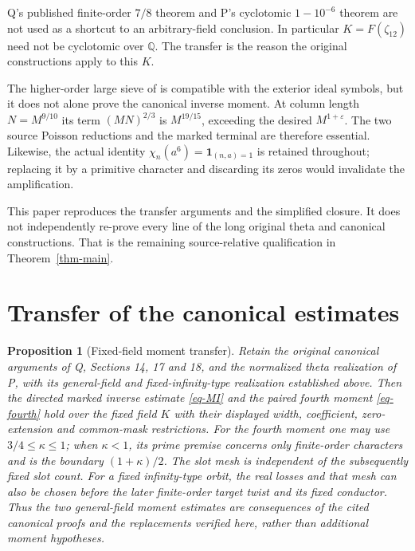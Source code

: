 \documentclass[11pt,a4paper]{article}
\newtheorem{proposition}[theorem]{Proposition}
\theoremstyle{remark}\newtheorem{remark}[theorem]{Remark}
\newcommand{\eps}{\varepsilon}
\newcommand{\one}{\mathbf 1}
\numberwithin{equation}{section}
\begin{document}
Q's published finite-order $7/8$ theorem and P's cyclotomic
$1-10^{-6}$ theorem are not used as a shortcut to an arbitrary-field
conclusion. In particular $K=F(\zeta_{12})$ need not be cyclotomic
over $\mathbb Q$. The transfer is the reason the original
constructions apply to this $K$.

The higher-order large sieve of \cite[Theorem 1.3]{BGL} is compatible
with the exterior ideal symbols, but it does not alone prove the
canonical inverse moment. At column length $N=M^{9/10}$ its term
$(MN)^{2/3}$ is $M^{19/15}$, exceeding the desired $M^{1+\eps}$.
The two source Poisson reductions and the marked terminal are
therefore essential. Likewise, the actual identity
$\chi_n(a^6)=\one_{(n,a)=1}$ is retained throughout; replacing it
by a primitive character and discarding its zeros would invalidate
the amplification.

This paper reproduces the transfer arguments and the simplified
closure. It does not independently re-prove every line of the
long original theta and canonical constructions. That is the
remaining source-relative qualification in Theorem~\ref{thm-main}.

\appendix
\section{Transfer of the canonical estimates}\label{app-transfer}

\begin{proposition}[Fixed-field moment transfer]
\label{prop-recovered-moment-transfer}
Retain the original canonical arguments of Q, Sections 14, 17 and 18,
and the normalized theta realization of P, with its general-field and
fixed-infinity-type realization established above. Then the directed
marked inverse estimate \eqref{eq-MI} and the paired fourth moment
\eqref{eq-fourth} hold over the fixed field $K$ with their displayed
width, coefficient, zero-extension and common-mask restrictions.
For the fourth moment one may use $3/4\le\kappa\le1$; when
$\kappa<1$, its prime premise concerns only finite-order characters
and is the boundary $(1+\kappa)/2$.
The slot mesh is independent of the subsequently fixed slot count.
For a fixed infinity-type orbit, the real losses and that mesh can
also be chosen before the later finite-order target twist and its
fixed conductor. Thus the two general-field moment estimates are
consequences of the cited canonical proofs and the replacements
verified here, rather than additional moment hypotheses.
\end{proposition}
\end{document}
